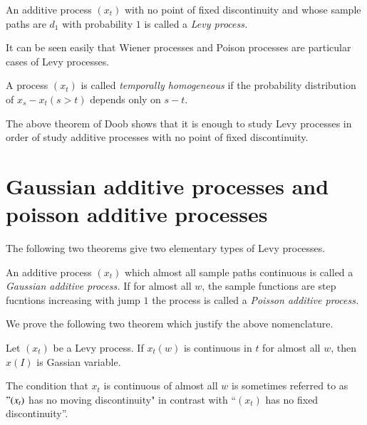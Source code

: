 \begin{defi*}
  An additive process $(x_t)$ with no point of fixed discontinuity and
  whose sample paths are $d_1$ with probability $1$ is called a {\em
    Levy process.} 
\end{defi*}

It can be seen easily that Wiener processes and Poison processes are
particular cases of Levy processes. 

\begin{defi*}
A process $(x_t)$ is called {\em temporally homogeneous} if the
  probability distribution of $x_s-x_t(s>t)$ depends only on $s-t$. 
\end{defi*}

The above theorem of Doob shows that it is enough to study Levy
processes in order of study additive processes with no point of fixed
discontinuity. 

\section[Gaussian additive processes and ...]{Gaussian additive processes and poisson additive
  processes}\label{chap4-sec2} 

The following two theorems give two elementary types of Levy processes.
\begin{defi*}
 An additive process $(x_t)$ which almost all sample paths continuous
  is called a {\em Gaussian additive process.} If for almost all
  $w$,\pageoriginale 
  the sample functions are step fucntions increasing with jump $1$ the
  process is called a {\em Poisson additive process.} 
\end{defi*}

We prove the following two theorem which justify the above nomenclature.
\setcounter{thm}{0}
\begin{thm}\label{chap4-sec2-thm1}%
  Let $(x_t)$ be a Levy process. If $x_t(w)$ is continuous in $t$ for
  almost all $w$, then $x(I)$ is Gassian variable. 


The condition that $x_t$ is continuous of almost all $w$ is sometimes
referred to as $"(x_t)$ has no moving discontinuity" in contrast with
``$(x_t)$ has no fixed discontinuity''. 
\end{thm}

